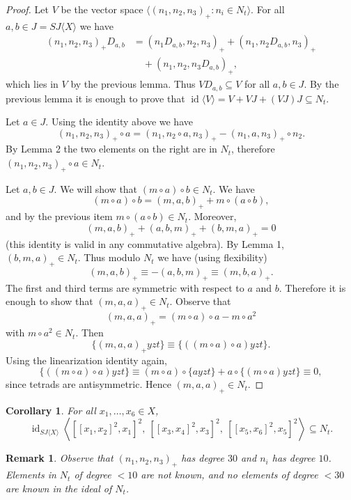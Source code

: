 \documentclass{article}
\newtheorem{corollary}[theorem]{Corollary}
\newtheorem{remark}[theorem]{Remark}
\begin{document}
\begin{proof}
Let $V$ be the vector space $\langle (n_1, n_2, n_3)_+ : n_i \in N_t \rangle$. For all $a, b \in J = SJ\langle X \rangle$ we have
\[
\begin{aligned}
(n_1, n_2, n_3)_+ D_{a, b} &= (n_1 D_{a, b}, n_2, n_3)_+ + (n_1, n_2 D_{a, b}, n_3)_+ \\
&\quad + (n_1, n_2, n_3 D_{a, b})_+,
\end{aligned}
\]
which lies in $V$ by the previous lemma. Thus $V D_{a, b} \subseteq V$ for all $a, b \in J$. By the previous lemma it is enough to prove that $\operatorname{id}\langle V \rangle = V + VJ + (VJ)J \subseteq N_t$.

Let $a \in J$. Using the identity above we have
\[
(n_1, n_2, n_3)_+ \circ a = (n_1, n_2 \circ a, n_3)_+ - (n_1, a, n_3)_+ \circ n_2.
\]
By Lemma 2 the two elements on the right are in $N_t$, therefore $(n_1, n_2, n_3)_+ \circ a \in N_t$.

Let $a, b \in J$. We will show that $(m \circ a) \circ b \in N_t$. We have
\[
(m \circ a) \circ b = (m, a, b)_+ + m \circ (a \circ b),
\]
and by the previous item $m \circ (a \circ b) \in N_t$. Moreover,
\[
(m, a, b)_+ + (a, b, m)_+ + (b, m, a)_+ = 0
\]
(this identity is valid in any commutative algebra). By Lemma 1, $(b, m, a)_+ \in N_t$. Thus modulo $N_t$ we have (using flexibility)
\[
(m, a, b)_+ \equiv -(a, b, m)_+ \equiv (m, b, a)_+.
\]
The first and third terms are symmetric with respect to $a$ and $b$. Therefore it is enough to show that $(m, a, a)_+ \in N_t$. Observe that
\[
(m, a, a)_+ = (m \circ a) \circ a - m \circ a^2
\]
with $m \circ a^2 \in N_t$. Then
\[
\{(m, a, a)_+ y z t\} \equiv \{((m \circ a) \circ a) y z t\}.
\]
Using the linearization identity again,
\[
\{((m \circ a) \circ a) y z t\} \equiv (m \circ a) \circ \{a y z t\} + a \circ \{(m \circ a) y z t\} \equiv 0,
\]
since tetrads are antisymmetric. Hence $(m, a, a)_+ \in N_t$.
\end{proof}

\begin{corollary}
For all $x_1, \ldots, x_6 \in X$,
\[
\operatorname{id}_{SJ\langle X \rangle}\left\langle [[x_1, x_2]^2, x_1]^2,\ [[x_3, x_4]^2, x_3]^2,\ [[x_5, x_6]^2, x_5]^2 \right\rangle \subseteq N_t.
\]
\end{corollary}

\begin{remark}
Observe that $(n_1, n_2, n_3)_+$ has degree $30$ and $n_i$ has degree $10$. Elements in $N_t$ of degree $<10$ are not known, and no elements of degree $<30$ are known in the ideal of $N_t$.
\end{remark}
\end{document}
